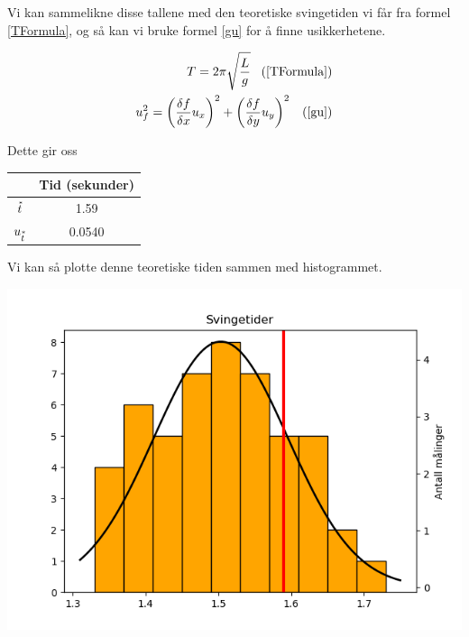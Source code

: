 Vi kan sammelikne disse tallene med den teoretiske svingetiden vi får fra formel \ref{TFormula}, og så kan vi bruke formel \ref{gu} for å finne usikkerhetene.

\newcommand{\alignref}[1]{\;\;\;\text{$\left(\ref{#1}\right)$}}

\begin{align*}
    T =2\pi\sqrt{\frac{L}{g}} \alignref{TFormula}\\
    u_f^2 = \left(\frac{\delta f}{\delta x} u_x\right)^2 + \left(\frac{\delta f}{\delta y} u_y\right)^2 \alignref{gu}
\end{align*}

Dette gir oss

\begin{center}
\begin{tabular}{ | c | c | }
    \hline
    & Tid (sekunder)\\
    \hline
     $\accentset{*}{t}$ & 1.59\\
    \hline
     $u_{\accentset{*}{t}}$ & 0.0540\\
    \hline
\end{tabular}
\end{center}

Vi kan så plotte denne teoretiske tiden sammen med histogrammet.

\begin{center}
    \includegraphics[scale = 0.6]{Figurer/Lab_1_Hist_2.png} \label{Hist_2}
\end{center}

